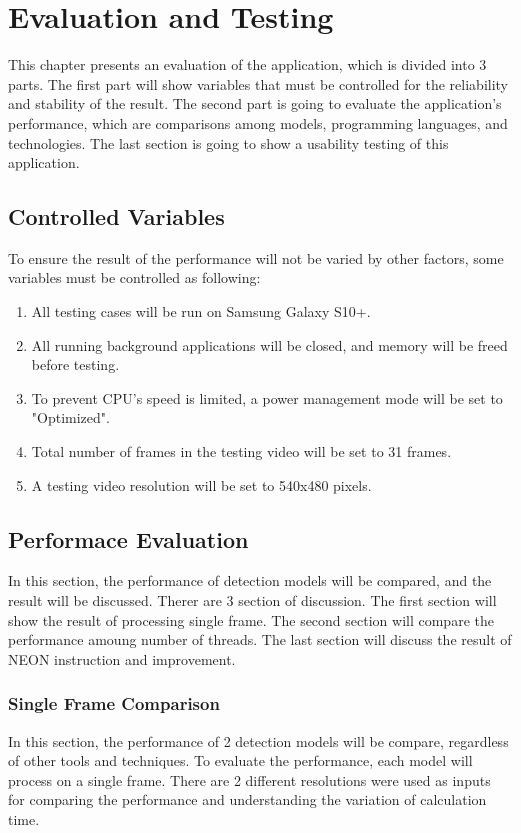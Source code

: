 \chapter{Evaluation and Testing}\label{testing}

    This chapter presents an evaluation of the application, which is divided into 3 parts.
    The first part will show variables that must be controlled for the reliability and stability of the result.
    The second part is going to evaluate the application's performance,
    which are comparisons among models, programming languages, and technologies.
    The last section is going to show a usability testing of this application.

    \section{Controlled Variables}
        To ensure the result of the performance will not be varied by other factors, some variables must be controlled as following:
        \begin{enumerate}
            \item All testing cases will be run on Samsung Galaxy S10+.
            \item All running background applications will be closed, and memory will be freed before testing.
            \item To prevent CPU's speed is limited, a power management mode will be set to "Optimized".
            \item Total number of frames in the testing video will be set to 31 frames.
            \item A testing video resolution will be set to 540x480 pixels.
        \end{enumerate}

    \section{Performace Evaluation}
        In this section, the performance of detection models will be compared, and the result will be discussed.
        Therer are 3 section of discussion. The first section will show the result of processing single frame.
        The second section will compare the performance amoung number of threads.
        The last section will discuss the result of NEON instruction and improvement.

        \subsection{Single Frame Comparison}
            In this section, the performance of 2 detection models will be compare, regardless of other tools and techniques.
            To evaluate the performance, each model will process on a single frame.
            There are 2 different resolutions were used as inputs for comparing the performance and understanding the variation of calculation time.

